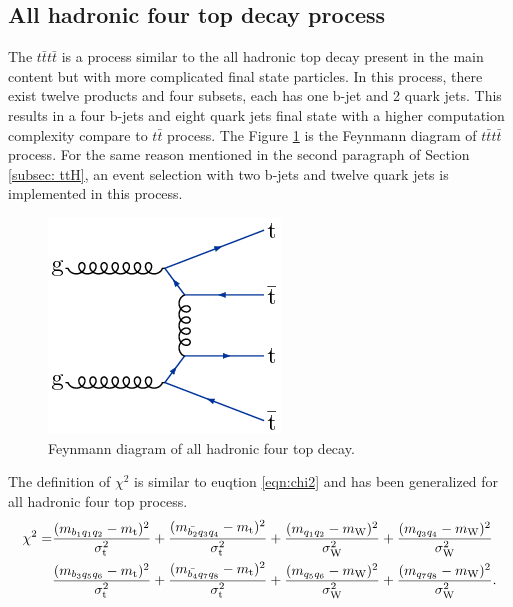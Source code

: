 \subsection{All hadronic four top decay process}\label{subsec: four top}
The $t\bar{t}t\bar{t}$ is a process similar to the all hadronic top decay present in the main content but with more complicated final state particles. In this process, there exist twelve products and four subsets, each has one b-jet and 2 quark jets. This results in a four b-jets and eight quark jets final state with a higher computation complexity compare to $t\bar{t}$ process. The Figure \ref{fig:tttt} is the Feynmann diagram of $t\bar{t}t\bar{t}$ process. For the same reason mentioned in the second paragraph of Section \ref{subsec: ttH}, an event selection with two b-jets and twelve quark jets is implemented in this process. 
\\
\begin{figure}[H]
	\includegraphics[width=0.5\linewidth]{Figures/four_top_LO.png}
	\caption{Feynmann diagram of all hadronic four top decay\cite{CMS:2017ocm}.}
	\label{fig:tttt}
\end{figure}
The definition of $\chi^{2}$ is similar to euqtion \ref{eqn:chi2} and has been generalized for all hadronic four top process.
\begin{equation}\label{eqn:chi2_tttt}
	\begin{split}
		\chi^{2} = &\frac{( m_{b_{1}q_{1}q_{2}} - m_{\rm t} )^{2}}{\sigma_{\rm t}^{2}} + \frac{( m_{\bar{b_{2}}q_{3}q_{4}} - m_{\rm t} )^{2}}{\sigma_{\rm t}^{2}} + \frac{(m_{q_{1}q_{2}} - m_{\rm W})^{2}}{\sigma^{2}_{\rm W}} + \frac{(m _{q_{3}q_{4}} - m_{\rm W})^{2}}{\sigma^{2}_{\rm W}} \\ 
		&\frac{( m_{b_{3}q_{5}q_{6}} - m_{\rm t} )^{2}}{\sigma_{\rm t}^{2}} + \frac{( m_{\bar{b_{4}}q_{7}q_{8}} - m_{\rm t} )^{2}}{\sigma_{\rm t}^{2}} + \frac{(m_{q_{5}q_{6}} - m_{\rm W})^{2}}{\sigma^{2}_{\rm W}} + \frac{(m _{q_{7}q_{8}} - m_{\rm W})^{2}}{\sigma^{2}_{\rm W}}.
	\end{split}	
\end{equation} 
